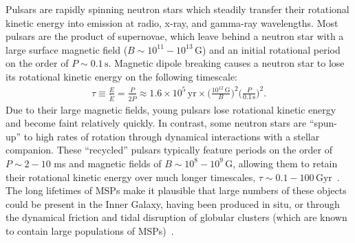 \documentclass[a4paper,11pt]{article}
\begin{document}
Pulsars are rapidly spinning neutron stars which steadily transfer their rotational kinetic energy into emission at radio, x-ray, and gamma-ray wavelengths. Most pulsars are the product of supernovae, which leave behind a neutron star with a large surface magnetic field ($B\sim 10^{11}-10^{13} \, \textrm{G}$) and an initial rotational period on the order of $P \sim 0.1 \, \textrm{s}$. Magnetic dipole breaking causes a neutron star to lose its rotational kinetic energy on the following timescale:
%
\begin{align}
\tau \equiv \frac{E}{\dot{E}} = \frac{P}{2\dot{P}} \approx 1.6 \times 10^5 \, \textrm{yr} \times \bigg(\frac{10^{12} \, \textrm{G}}{B}\bigg)^2 \bigg(\frac{P}{0.1 \, \textrm{s}}\bigg)^2.
\end{align}
%
Due to their large magnetic fields, young pulsars lose rotational kinetic energy and become faint relatively quickly. In contrast, some neutron stars are ``spun-up'' to high rates of rotation through dynamical interactions with a stellar companion. These ``recycled'' pulsars typically feature periods on the order of $P\sim 2-10$ ms and magnetic fields of $B\sim 10^8-10^9 \, \textrm{G}$, allowing them to retain their rotational kinetic energy over much longer timescales, \mbox{$\tau \sim 0.1-100 \, \textrm{Gyr}$~\cite{1982Natur.300..728A,Lorimer:2001vd,Phinney:1994gf,Lorimer:2008se,Kiziltan:2009rx}.} The long lifetimes of MSPs make it plausible that large numbers of these objects could be present in the Inner Galaxy, having been produced in situ, or through the dynamical friction and tidal disruption of globular clusters (which are known to contain large populations of MSPs)~\cite{Brandt:2015ula,Fragione:2017rsp,Gnedin:2013cda}. 
\end{document}
